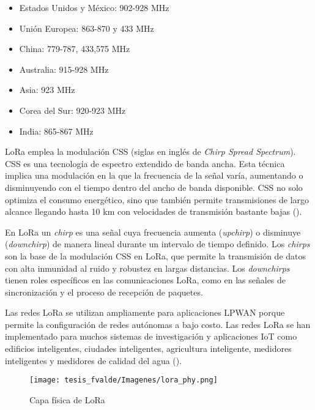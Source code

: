 \begin{itemize}
  \item Estados Unidos y México: 902-928 MHz
  \item Unión Europea: 863-870 y 433 MHz
  \item China: 779-787, 433,575 MHz
  \item Australia: 915-928 MHz
  \item Asia: 923 MHz
  \item Corea del Sur: 920-923 MHz
  \item India: 865-867 MHz
\end{itemize}

\vspace{0.5cm}

LoRa emplea la modulación CSS (siglas en inglés de \textit{Chirp Spread Spectrum}). CSS es una tecnología de espectro extendido de banda ancha. Esta técnica implica una modulación en la que la frecuencia de la señal varía, aumentando o disminuyendo con el tiempo dentro del ancho de banda disponible. CSS no solo optimiza el consumo energético, sino que también permite transmisiones de largo alcance llegando hasta 10 km con velocidades de transmisión bastante bajas (\cite{Herrero2023}).

\vspace{0.5cm}

En LoRa un \textit{chirp} es una señal cuya frecuencia aumenta (\textit{upchirp}) o disminuye (\textit{downchirp}) de manera lineal durante un intervalo de tiempo definido. Los \textit{chirps} son la base de la modulación CSS en LoRa, que permite la transmisión de datos con alta inmunidad al ruido y robustez en largas distancias. Los \textit{downchirps} tienen roles específicos en las comunicaciones LoRa, como en las señales de sincronización y el proceso de recepción de paquetes.

\vspace{0.5cm}

Las redes LoRa se utilizan ampliamente para aplicaciones LPWAN porque permite la configuración de redes autónomas a bajo costo. Las redes LoRa se han implementado para muchos sistemas de investigación y aplicaciones IoT como edificios inteligentes, ciudades inteligentes, agricultura inteligente, medidores inteligentes y medidores de calidad del agua (\cite{sundaram2019}).

\vspace{0.5cm}

\begin{figure}[h]
    \centering
    \texttt{[image: tesis\_fvalde/Imagenes/lora\_phy.png]}
    \caption{Capa física de LoRa}
    \label{fig:lora_phy}
\end{figure}

